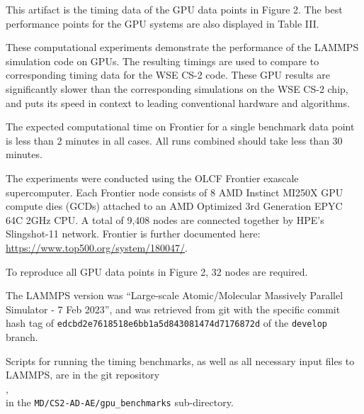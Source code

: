 \documentclass[conference]{IEEEtran}
\begin{document}
\newartifact

\artrel

This artifact is the timing data of the GPU data points in Figure 2. The best performance points for the GPU systems are also displayed in Table III.

\artexp

These computational experiments demonstrate the performance of the LAMMPS simulation code on GPUs. The resulting timings are used to compare to corresponding timing data for the WSE CS-2 code. These GPU results are significantly slower than the corresponding simulations on the WSE CS-2 chip, and puts its speed in context to leading conventional hardware and algorithms.

\arttime

The expected computational time on Frontier for a single benchmark data point is less than 2 minutes in all cases. All runs combined should take less than 30 minutes.

\artin


\artexpl{
}

The experiments were conducted using the OLCF Frontier exascale supercomputer. Each Frontier node consists of 8 AMD Instinct MI250X GPU compute dies (GCDs) attached to an AMD Optimized 3rd Generation EPYC 64C 2GHz CPU. A total of 9,408 nodes are connected together by HPE's Slingshot-11 network. Frontier is further documented here: \url{https://www.top500.org/system/180047/}.

To reproduce all GPU data points in Figure 2, 32 nodes are required.



The LAMMPS version was ``Large-scale Atomic/Molecular Massively Parallel Simulator - 7 Feb 2023'', and was retrieved from git with the specific commit hash tag of \texttt{edcbd2e7618518e6bb1a5d843081474d7176872d} of the \texttt{develop} branch.


Scripts for running the timing benchmarks, as well as all necessary input files to LAMMPS, are in the git repository\\ \phantom{xxx}\gitrepo,\\ in the \texttt{MD/CS2-AD-AE/gpu\_benchmarks} sub-directory.
\end{document}
